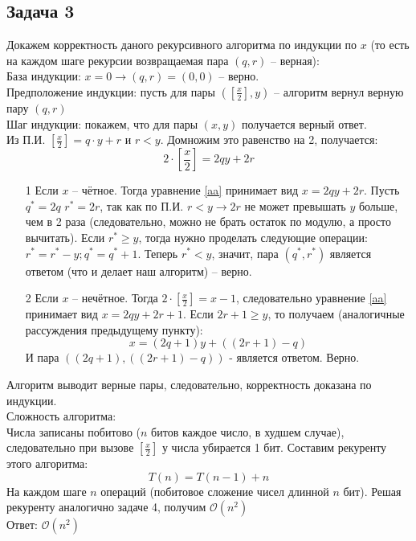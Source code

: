 \documentclass[a4paper,12pt]{article} %
\begin{document}
\subsection*{Задача 3}
Докажем корректность даного рекурсивного алгоритма по индукции по $ x $ (то есть на каждом шаге рекурсии возвращаемая пара $ (q, r) $ -- верная):\\
База индукции: $ x = 0 \longrightarrow (q,r) = (0,0)$ -- верно.\\
Предположение индукции: пусть для пары $ \left(\left[\frac{x}{2}\right], y\right) $ -- алгоритм вернул верную пару $ (q,r) $\\
Шаг индукции: покажем, что для пары $ (x,y) $ получается верный ответ.  \\
Из П.И. $ \left[\frac{x}{2}\right] = q \cdot y + r $ и $ r < y $. Домножим это равенство на 2, получается:
\begin{equation}
\label{aa}
2 \cdot \left[\frac{x}{2}\right] = 2qy + 2r 
\end{equation} 

\begin{itemize}
\item[1] Если $ x $ -- чётное. Тогда уравнение \eqref{aa} принимает вид $ x = 2qy + 2r $. Пусть $ q^* = 2q$  $r^* = 2r $, так как по П.И. $ r < y \longrightarrow 2r $ не может превышать $ y $ больше, чем в 2 раза (следовательно, можно не брать остаток по модулю, а просто вычитать). Если $ r^* \geq y $, тогда нужно проделать следующие операции: $ r^* = r^* - y ; q^* = q^* + 1 $. Теперь $ r^* < y $, значит, пара $ (q^*, r^*) $ является ответом (что и делает наш алгоритм) -- верно.
\item[2] Если $ x $ -- нечётное. Тогда $ 2 \cdot \left[\frac{x}{2}\right] = x - 1 $, следовательно уравнение \eqref{aa} принимает вид $ x = 2qy + 2r + 1 $. Если $ 2r + 1 \geq y $, то получаем (аналогичные рассуждения предыдущему пункту):
$$
x = \left(2q + 1 \right)y + \left( \left(2r + 1 \right) - q \right)
$$
И пара $(\left(2q + 1 \right), \left( \left(2r + 1 \right) - q \right) )  $ - является ответом. Верно.
\end{itemize}
Алгоритм выводит верные пары, следовательно, корректность доказана по индукции.\\

Сложность алгоритма:\\
Числа записаны побитово ($ n $ битов каждое число, в худшем случае), следовательно при вызове $\left[\frac{x}{2}\right]$ у числа убирается 1 бит. Составим рекуренту этого алгоритма:
$$
T(n) = T(n - 1) + n 
$$
На каждом шаге $ n $ операций (побитовое сложение чисел длинной  $ n $ бит). Решая рекуренту аналогично задаче 4, получим $\mathcal{O}(n^2)$\\
Ответ: $\mathcal{O}(n^2)$
\end{document}
